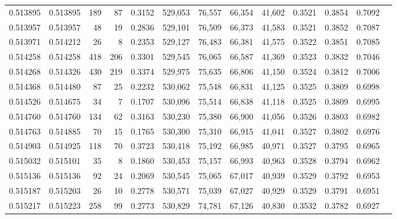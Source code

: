 \begin{tabular}{rrrrrrrrrrrrr}
0.513895 & 0.513895 &   189 &    87 &                                     0.3152 & 529,053 &  76,557 &  66,354 &  41,602 & 0.3521 & 0.3854 & 0.7092 \\
0.513957 & 0.513957 &    48 &    19 &                                     0.2836 & 529,101 &  76,509 &  66,373 &  41,583 & 0.3521 & 0.3852 & 0.7087 \\
0.513971 & 0.514212 &    26 &     8 &                                     0.2353 & 529,127 &  76,483 &  66,381 &  41,575 & 0.3522 & 0.3851 & 0.7085 \\
0.514258 & 0.514258 &   418 &   206 &                                     0.3301 & 529,545 &  76,065 &  66,587 &  41,369 & 0.3523 & 0.3832 & 0.7046 \\
0.514268 & 0.514326 &   430 &   219 &                                     0.3374 & 529,975 &  75,635 &  66,806 &  41,150 & 0.3524 & 0.3812 & 0.7006 \\
0.514368 & 0.514480 &    87 &    25 &                                     0.2232 & 530,062 &  75,548 &  66,831 &  41,125 & 0.3525 & 0.3809 & 0.6998 \\
0.514526 & 0.514675 &    34 &     7 &                                     0.1707 & 530,096 &  75,514 &  66,838 &  41,118 & 0.3525 & 0.3809 & 0.6995 \\
0.514760 & 0.514760 &   134 &    62 &                                     0.3163 & 530,230 &  75,380 &  66,900 &  41,056 & 0.3526 & 0.3803 & 0.6982 \\
0.514763 & 0.514885 &    70 &    15 &                                     0.1765 & 530,300 &  75,310 &  66,915 &  41,041 & 0.3527 & 0.3802 & 0.6976 \\
0.514903 & 0.514925 &   118 &    70 &                                     0.3723 & 530,418 &  75,192 &  66,985 &  40,971 & 0.3527 & 0.3795 & 0.6965 \\
0.515032 & 0.515101 &    35 &     8 &                                     0.1860 & 530,453 &  75,157 &  66,993 &  40,963 & 0.3528 & 0.3794 & 0.6962 \\
0.515136 & 0.515136 &    92 &    24 &                                     0.2069 & 530,545 &  75,065 &  67,017 &  40,939 & 0.3529 & 0.3792 & 0.6953 \\
0.515187 & 0.515203 &    26 &    10 &                                     0.2778 & 530,571 &  75,039 &  67,027 &  40,929 & 0.3529 & 0.3791 & 0.6951 \\
0.515217 & 0.515223 &   258 &    99 &                                     0.2773 & 530,829 &  74,781 &  67,126 &  40,830 & 0.3532 & 0.3782 & 0.6927 \\

\end{tabular}
